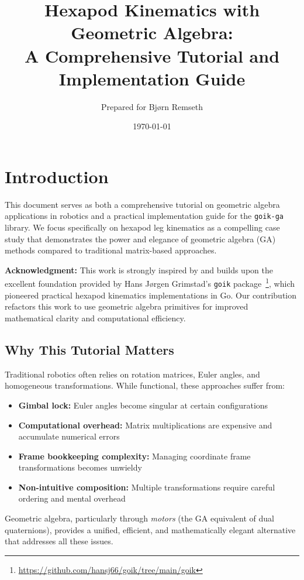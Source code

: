 \documentclass[11pt]{article}
\title{Hexapod Kinematics with Geometric Algebra:\\A Comprehensive Tutorial and Implementation Guide}
\author{Prepared for Bj\o rn Remseth}
\date{\today}
\begin{document}
\maketitle

\tableofcontents
\newpage

\section{Introduction}

This document serves as both a comprehensive tutorial on geometric algebra applications in robotics and a practical implementation guide for the \texttt{goik-ga} library. We focus specifically on hexapod leg kinematics as a compelling case study that demonstrates the power and elegance of geometric algebra (GA) methods compared to traditional matrix-based approaches.

\noindent\textbf{Acknowledgment:} This work is strongly inspired by and builds upon the excellent foundation provided by Hans Jørgen Grimstad's \texttt{goik} package~\footnote{\url{https://github.com/hansj66/goik/tree/main/goik}}, which pioneered practical hexapod kinematics implementations in Go. Our contribution refactors this work to use geometric algebra primitives for improved mathematical clarity and computational efficiency.

\subsection{Why This Tutorial Matters}

Traditional robotics often relies on rotation matrices, Euler angles, and homogeneous transformations. While functional, these approaches suffer from:
\begin{itemize}
    \item \textbf{Gimbal lock:} Euler angles become singular at certain configurations
    \item \textbf{Computational overhead:} Matrix multiplications are expensive and accumulate numerical errors
    \item \textbf{Frame bookkeeping complexity:} Managing coordinate frame transformations becomes unwieldy
    \item \textbf{Non-intuitive composition:} Multiple transformations require careful ordering and mental overhead
\end{itemize}

Geometric algebra, particularly through \emph{motors} (the GA equivalent of dual quaternions), provides a unified, efficient, and mathematically elegant alternative that addresses all these issues.
\end{document}
